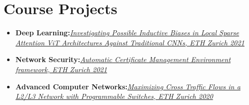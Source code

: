 \section{Course Projects}

\begin{itemize}

\item \textbf{Deep Learning:}\emph{ {\href{https://github.com/Siddhant-Ray/Deep-Learning-Project-2021}{Investigating Possible Inductive Biases in Local Sparse Attention ViT Architectures Against Traditional CNNs, ETH Zurich 2021 }}} 
\item \textbf{Network Security:}\emph{ {\href{https://github.com/Siddhant-Ray/NetworkSecurity-ACME-Project}{Automatic Certificate Management Environment framework, ETH Zurich 2021  }}}
\item  \textbf{Advanced Computer Networks:}\emph{ {\href{https://github.com/Siddhant-Ray/Advnet-Project-ETH}{Maximizing Cross Traffic Flows in a L2/L3 Network with Programmable Switches, ETH Zurich 2020 }}} 
\end{itemize}